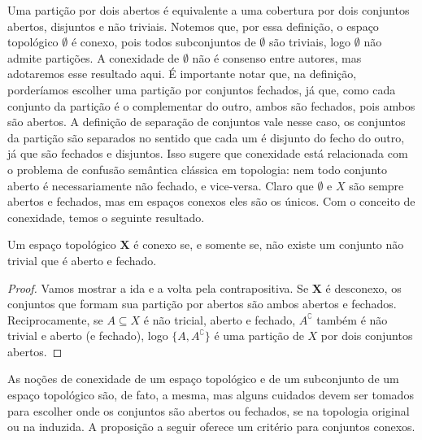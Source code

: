 Uma partição por dois abertos é equivalente a uma cobertura por dois conjuntos abertos, disjuntos e não triviais. Notemos que, por essa definição, o espaço topológico $\bm \emptyset$ é conexo, pois todos subconjuntos de $\emptyset$ são triviais, logo $\emptyset$ não admite partições. A conexidade de $\emptyset$ não é consenso entre autores, mas adotaremos esse resultado aqui. É importante notar que, na definição, porderíamos escolher uma partição por conjuntos fechados, já que, como cada conjunto da partição é o complementar do outro, ambos são fechados, pois ambos são abertos. A definição de separação de conjuntos vale nesse caso, os conjuntos da partição são separados no sentido que cada um é disjunto do fecho do outro, já que são fechados e disjuntos. Isso sugere que conexidade está relacionada com o problema de confusão semântica clássica em topologia: nem todo conjunto aberto é necessariamente não fechado, e vice-versa. Claro que $\emptyset$ e $X$ são sempre abertos e fechados, mas em espaços conexos eles são os únicos. Com o conceito de conexidade, temos o seguinte resultado.

\begin{prop}
Um espaço topológico $\bm X$ é conexo se, e somente se, não existe um conjunto não trivial que é aberto e fechado.
\end{prop}
\begin{proof}
Vamos mostrar a ida e a volta pela contrapositiva. Se $\bm X$ é desconexo, os conjuntos que formam sua partição por abertos são ambos abertos e fechados. Reciprocamente, se $A \subseteq X$ é não tricial, aberto e fechado, $A^\complement$ também é não trivial e aberto (e fechado), logo $\{A, A^\complement\}$ é uma partição de $X$ por dois conjuntos abertos.
\end{proof}

As noções de conexidade de um espaço topológico e de um subconjunto de um espaço topológico são, de fato, a mesma, mas alguns cuidados devem ser tomados para escolher onde os conjuntos são abertos ou fechados, se na topologia original ou na induzida. A proposição a seguir oferece um critério para conjuntos conexos.

